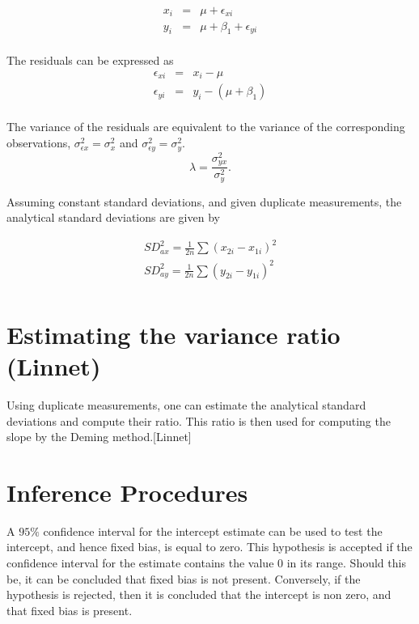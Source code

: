 \documentclass[12pt, a4paper]{report}
\theoremstyle{plain}
\theoremstyle{definition}
\theoremstyle{remark}
\begin{document}
\begin{eqnarray*}
	x_{i} &=& \mu + \epsilon_{xi}\\
	y_{i} &=& \mu +  \beta_{1} + \epsilon_{yi}\\
\end{eqnarray*}

The residuals can be expressed as
\begin{eqnarray*}
	\epsilon_{xi} &=& x_{i} - \mu  \\
	\epsilon_{yi} &=& y_{i} - (\mu + \beta_{1}) \\
\end{eqnarray*}

The variance of the residuals are equivalent to the variance of the corresponding observations, $\sigma^{2}_{\epsilon x} =
\sigma^{2}_{x}$ and $\sigma^{2}_{\epsilon y} = \sigma^{2}_{y}$.
\begin{equation}
\lambda = \frac{\sigma^{2}_{yx}}{\sigma^{2}_{y}}.
\end{equation}

Assuming constant standard deviations, and given duplicate measurements, the analytical standard deviations are given by

\begin{eqnarray*}
	SD^{2}_{ax} = \frac{1}{2n} \sum (x_{2i} - x_{1i})^{2}\\
	SD^{2}_{ay} = \frac{1}{2n} \sum (y_{2i} - y_{1i})^{2}\\
\end{eqnarray*}


\section{Estimating the variance ratio (Linnet)}

Using duplicate measurements, one can estimate the analytical standard deviations and compute their ratio. This ratio is then used for computing the slope by the Deming method.[Linnet]



\section{Inference Procedures}
A $95\%$ confidence interval for the intercept estimate can be used to test the intercept, and hence fixed bias, is equal to
zero. This hypothesis is accepted if the confidence interval for the estimate contains the value $0$ in its range. Should this be,
it can be concluded that fixed bias is not present. Conversely, if the hypothesis is rejected, then it is concluded that the
intercept is non zero, and that fixed bias is present.
\end{document}
